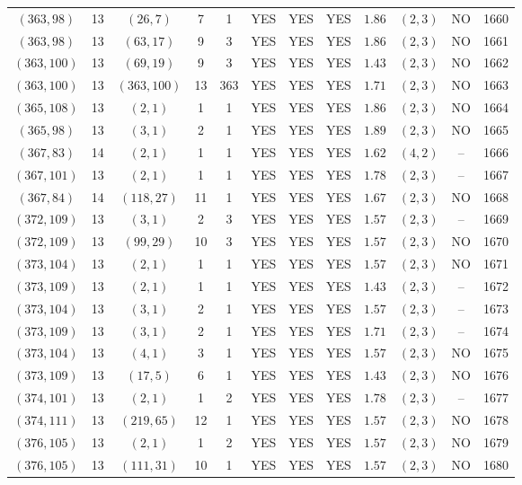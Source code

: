\begin{longtable}{|c|c|c|c|c|c|c|c|c|c|c|c|}
$(363,98)$ & 13 & $(26,7)$ & 7 & 1 & YES & YES & YES & $1.86$ & $(2,3)$ & NO & 1660\\
$(363,98)$ & 13 & $(63,17)$ & 9 & 3 & YES & YES & YES & $1.86$ & $(2,3)$ & NO & 1661\\
$(363,100)$ & 13 & $(69,19)$ & 9 & 3 & YES & YES & YES & $1.43$ & $(2,3)$ & NO & 1662\\
$(363,100)$ & 13 & $(363,100)$ & 13 & 363 & YES & YES & YES & $1.71$ & $(2,3)$ & NO & 1663\\
$(365,108)$ & 13 & $(2,1)$ & 1 & 1 & YES & YES & YES & $1.86$ & $(2,3)$ & NO & 1664\\
$(365,98)$ & 13 & $(3,1)$ & 2 & 1 & YES & YES & YES & $1.89$ & $(2,3)$ & NO & 1665\\
$(367,83)$ & 14 & $(2,1)$ & 1 & 1 & YES & YES & YES & $1.62$ & $(4,2)$ & -- & 1666\\
$(367,101)$ & 13 & $(2,1)$ & 1 & 1 & YES & YES & YES & $1.78$ & $(2,3)$ & -- & 1667\\
$(367,84)$ & 14 & $(118,27)$ & 11 & 1 & YES & YES & YES & $1.67$ & $(2,3)$ & NO & 1668\\
$(372,109)$ & 13 & $(3,1)$ & 2 & 3 & YES & YES & YES & $1.57$ & $(2,3)$ & -- & 1669\\
$(372,109)$ & 13 & $(99,29)$ & 10 & 3 & YES & YES & YES & $1.57$ & $(2,3)$ & NO & 1670\\
$(373,104)$ & 13 & $(2,1)$ & 1 & 1 & YES & YES & YES & $1.57$ & $(2,3)$ & NO & 1671\\
$(373,109)$ & 13 & $(2,1)$ & 1 & 1 & YES & YES & YES & $1.43$ & $(2,3)$ & -- & 1672\\
$(373,104)$ & 13 & $(3,1)$ & 2 & 1 & YES & YES & YES & $1.57$ & $(2,3)$ & -- & 1673\\
$(373,109)$ & 13 & $(3,1)$ & 2 & 1 & YES & YES & YES & $1.71$ & $(2,3)$ & -- & 1674\\
$(373,104)$ & 13 & $(4,1)$ & 3 & 1 & YES & YES & YES & $1.57$ & $(2,3)$ & NO & 1675\\
$(373,109)$ & 13 & $(17,5)$ & 6 & 1 & YES & YES & YES & $1.43$ & $(2,3)$ & NO & 1676\\
$(374,101)$ & 13 & $(2,1)$ & 1 & 2 & YES & YES & YES & $1.78$ & $(2,3)$ & -- & 1677\\
$(374,111)$ & 13 & $(219,65)$ & 12 & 1 & YES & YES & YES & $1.57$ & $(2,3)$ & NO & 1678\\
$(376,105)$ & 13 & $(2,1)$ & 1 & 2 & YES & YES & YES & $1.57$ & $(2,3)$ & NO & 1679\\
$(376,105)$ & 13 & $(111,31)$ & 10 & 1 & YES & YES & YES & $1.57$ & $(2,3)$ & NO & 1680\\

\end{longtable}
